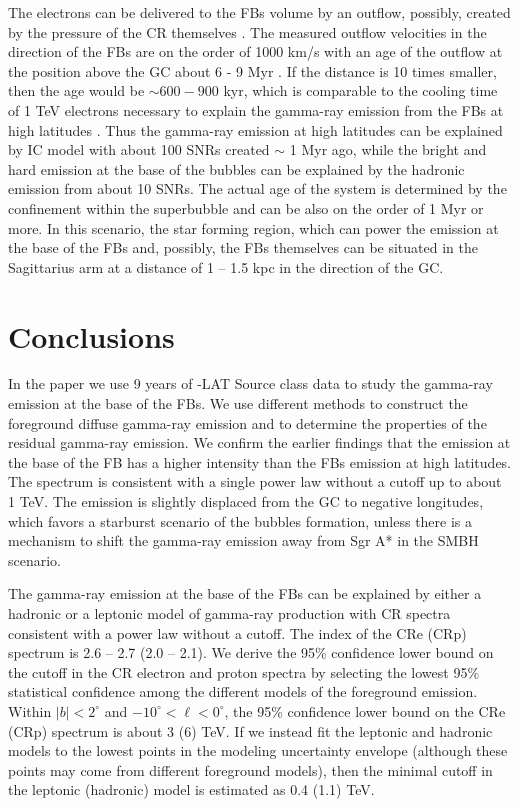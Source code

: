 The electrons can be delivered to the FBs volume by an outflow,
possibly, created by the pressure of the CR themselves \citep[e.g.,][]{2018MNRAS.475..570J}.
The measured outflow velocities in the direction of the FBs are on the order of 1000 km/s
with an age of the outflow at the position above the GC about 6 - 9 Myr \citep{2015ApJ...799L...7F, 2017ApJ...834..191B}.
If the distance is 10 times smaller, then the age would be $\sim 600 - 900$ kyr,
which is comparable to the cooling time of 1 TeV electrons necessary to explain the 
gamma-ray emission from the FBs at high latitudes \citep{2014ApJ...793...64A}.
Thus the gamma-ray emission at high latitudes can be explained by IC model with about 100 SNRs
created $\sim$ 1 Myr ago, while the bright and hard emission at the base of the bubbles can
be explained by the hadronic emission from about 10 SNRs. 
The actual age of the system is determined by the confinement within the superbubble and can be also on the order
of 1 Myr or more.
In this scenario,
the star forming region, which can power the emission at the base of the FBs and, possibly, the FBs themselves
can be situated in the Sagittarius arm at a distance of 1 -- 1.5 kpc in the direction of the GC.


\section{Conclusions}

In the paper we use 9 years of \Fermi-LAT Source class data to study the gamma-ray emission
at the base of the FBs.
We use different methods to construct the foreground diffuse gamma-ray emission and to determine
the properties of the residual gamma-ray emission.
We confirm the earlier findings that the emission at the base of the FB
has a higher intensity than the FBs emission at high latitudes.
The spectrum is consistent with a single power law without a cutoff up to about 1 TeV.
The emission is slightly displaced from the GC to negative longitudes,
which favors a starburst scenario of the bubbles formation, unless there is a mechanism to shift the
gamma-ray emission away from Sgr A* in the SMBH scenario.

The gamma-ray emission at the base of the FBs can be explained by either a hadronic or a leptonic model of gamma-ray production
with CR spectra consistent with a power law without a cutoff.
The index of the CRe (CRp) spectrum is 2.6 -- 2.7 (2.0 -- 2.1).
We derive the 95\% confidence lower bound on the cutoff in the CR electron and proton spectra
by selecting the lowest 95\% statistical confidence among the different models of the foreground emission.
Within $|b| < 2^\circ$ and $-10^\circ < \ell < 0^\circ$, the 95\% confidence lower bound on the CRe (CRp) spectrum is
about 3 (6) TeV.
If we instead fit the leptonic and hadronic models to the lowest points in the modeling uncertainty
envelope (although these points may
come from different foreground models), then the minimal cutoff in the leptonic (hadronic) model
is estimated as 0.4 (1.1) TeV.

